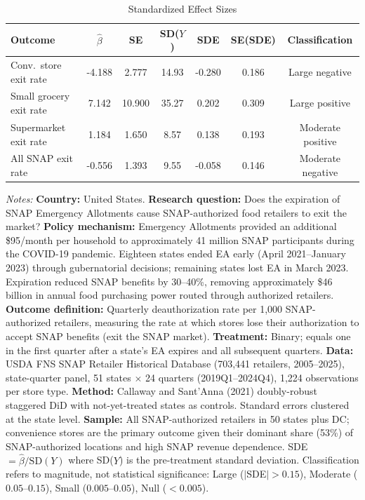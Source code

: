 \begin{table}[htbp]
\centering
\caption{Standardized Effect Sizes}
\label{tab:sde}
\begin{tabular}{lcccccc}
\toprule
Outcome & $\hat{\beta}$ & SE & SD($Y$) & SDE & SE(SDE) & Classification \\
\midrule
Conv.~store exit rate & -4.188 & 2.777 & 14.93 & -0.280 & 0.186 & Large negative \\
Small grocery exit rate & 7.142 & 10.900 & 35.27 & 0.202 & 0.309 & Large positive \\
Supermarket exit rate & 1.184 & 1.650 & 8.57 & 0.138 & 0.193 & Moderate positive \\
All SNAP exit rate & -0.556 & 1.393 & 9.55 & -0.058 & 0.146 & Moderate negative \\
\bottomrule
\end{tabular}
\begin{tablenotes}
\item \textit{Notes:} \textbf{Country:} United States. \textbf{Research question:} Does the expiration of SNAP Emergency Allotments cause SNAP-authorized food retailers to exit the market? \textbf{Policy mechanism:} Emergency Allotments provided an additional \$95/month per household to approximately 41 million SNAP participants during the COVID-19 pandemic. Eighteen states ended EA early (April 2021--January 2023) through gubernatorial decisions; remaining states lost EA in March 2023. Expiration reduced SNAP benefits by 30--40\%, removing approximately \$46 billion in annual food purchasing power routed through authorized retailers. \textbf{Outcome definition:} Quarterly deauthorization rate per 1,000 SNAP-authorized retailers, measuring the rate at which stores lose their authorization to accept SNAP benefits (exit the SNAP market). \textbf{Treatment:} Binary; equals one in the first quarter after a state's EA expires and all subsequent quarters. \textbf{Data:} USDA FNS SNAP Retailer Historical Database (703,441 retailers, 2005--2025), state-quarter panel, 51 states $\times$ 24 quarters (2019Q1--2024Q4), 1,224 observations per store type. \textbf{Method:} Callaway and Sant'Anna (2021) doubly-robust staggered DiD with not-yet-treated states as controls. Standard errors clustered at the state level. \textbf{Sample:} All SNAP-authorized retailers in 50 states plus DC; convenience stores are the primary outcome given their dominant share (53\%) of SNAP-authorized locations and high SNAP revenue dependence. SDE $= \hat{\beta} / \text{SD}(Y)$ where SD($Y$) is the pre-treatment standard deviation. Classification refers to magnitude, not statistical significance: Large ($|$SDE$| > 0.15$), Moderate ($0.05$--$0.15$), Small ($0.005$--$0.05$), Null ($< 0.005$).
\end{tablenotes}
\end{table}
